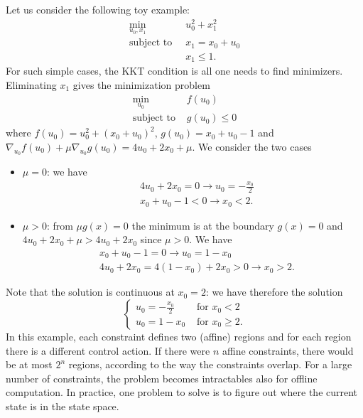 Let us consider the following toy example:
\begin{align*}
  \min_{u_0,x_1} &\ u_0^2+x_1^2 \\
  \text{subject to } &\ x_1 = x_0+u_0 \\
                 &\ x_1\le 1.
\end{align*}
For such simple cases, the KKT condition is all one needs to find minimizers. Eliminating $x_1$ gives the minimization problem
\begin{align*}
  \min_{u_0}\  & f(u_0) \\
  \text{subject to } & g(u_0) \le 0
\end{align*}
where $f(u_0) = u_0^2 + (x_0+u_0)^2$, $g(u_0) = x_0 + u_0 - 1$ and $\nabla_{u_0} f(u_0) + \mu \nabla_{u_0} g(u_0) = 4u_0 + 2x_0 + \mu$. We consider the two cases
\begin{itemize}
\item $\mu = 0$: we have
  \begin{align*}
    & 4u_0 + 2x_0 = 0 \rightarrow u_0 = -\frac{x_0}{2} \\
    & x_0 + u_0 - 1 < 0 \rightarrow x_0 < 2.
  \end{align*}
\item $\mu > 0$: from $\mu g(x) = 0$ the minimum is at the boundary $g(x)=0$ and $4u_0+2x_0+\mu > 4u_0+2x_0$ since $\mu>0$. We have
  \begin{align*}
    &x_0 + u_0 - 1 = 0 \rightarrow u_0 = 1-x_0 \\
    &4u_0 + 2x_0 = 4(1-x_0) + 2x_0 > 0 \rightarrow x_0 > 2.
  \end{align*}
\end{itemize}
Note that the solution is continuous at $x_0=2$: we have therefore the solution
\begin{equation*}
  \begin{cases}
    u_0 = -\frac{x_0}{2} & \text{ for } x_0 < 2 \\
    u_0 = 1-x_0 & \text{ for } x_0 \ge 2.
  \end{cases}
\end{equation*}
In this example, each constraint defines two (affine) regions and for each region there is a different control action. If there were $n$ affine constraints, there would be at most $2^n$ regions, according to the way the constraints overlap. For a large number of constraints, the problem becomes intractables also for offline computation. In practice, one problem to solve is to figure out where the current state is in the state space.

